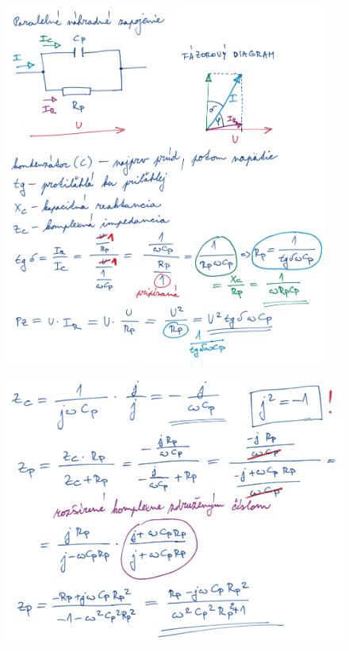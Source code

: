 \begin{figure}[h]
    \centering
    \includegraphics*[width=0.95\textwidth]{images/diel6.jpg}
\end{figure}

\newpage

\begin{figure}[h]
    \centering
    \includegraphics*[width=\textwidth]{images/diel6_1.jpg}
\end{figure}

